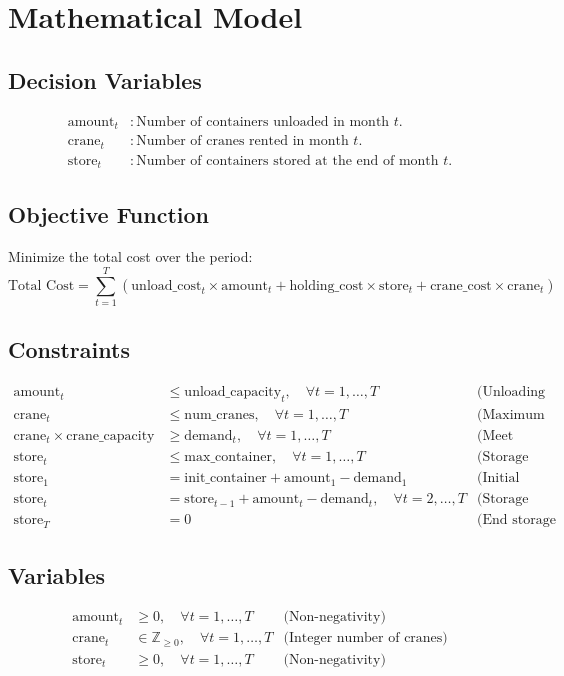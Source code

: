 \documentclass{article}
\begin{document}
\section*{Mathematical Model}

\subsection*{Decision Variables}
\begin{align*}
\text{amount}_t & : \text{Number of containers unloaded in month } t. \\
\text{crane}_t & : \text{Number of cranes rented in month } t. \\
\text{store}_t & : \text{Number of containers stored at the end of month } t.
\end{align*}

\subsection*{Objective Function}
Minimize the total cost over the period:
\[
\text{Total Cost} = \sum_{t=1}^{T} \left( \text{unload\_cost}_t \times \text{amount}_t + \text{holding\_cost} \times \text{store}_t + \text{crane\_cost} \times \text{crane}_t \right)
\]

\subsection*{Constraints}
\begin{align*}
\text{amount}_t & \leq \text{unload\_capacity}_t, \quad \forall t = 1, \ldots, T & \text{(Unloading capacity constraint)} \\
\text{crane}_t & \leq \text{num\_cranes}, \quad \forall t = 1, \ldots, T & \text{(Maximum cranes constraint)} \\
\text{crane}_t \times \text{crane\_capacity} & \geq \text{demand}_t, \quad \forall t = 1, \ldots, T & \text{(Meet demand constraint)} \\
\text{store}_t & \leq \text{max\_container}, \quad \forall t = 1, \ldots, T & \text{(Storage capacity constraint)} \\
\text{store}_1 & = \text{init\_container} + \text{amount}_1 - \text{demand}_1 & \text{(Initial storage calculation)} \\
\text{store}_{t} & = \text{store}_{t-1} + \text{amount}_t - \text{demand}_t, \quad \forall t = 2, \ldots, T & \text{(Storage balance)} \\
\text{store}_T & = 0 & \text{(End storage requirement)}
\end{align*}

\subsection*{Variables}
\begin{align*}
\text{amount}_t & \geq 0, \quad \forall t = 1, \ldots, T & \text{(Non-negativity)} \\
\text{crane}_t & \in \mathbb{Z}_{\geq 0}, \quad \forall t = 1, \ldots, T & \text{(Integer number of cranes)} \\
\text{store}_t & \geq 0, \quad \forall t = 1, \ldots, T & \text{(Non-negativity)}
\end{align*}
\end{document}
